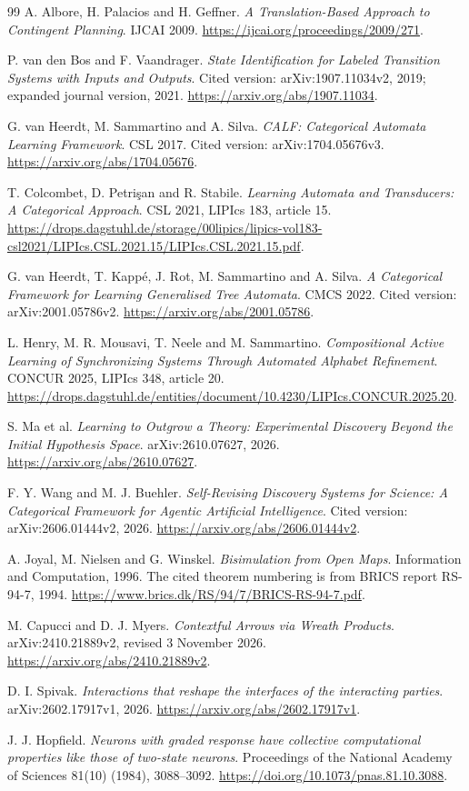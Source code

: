 \documentclass[11pt]{article}
\theoremstyle{definition}
\theoremstyle{remark}
\begin{document}
\begin{thebibliography}{99}
A. Albore, H. Palacios and H. Geffner.
\emph{A Translation-Based Approach to Contingent Planning}. IJCAI 2009.
\url{https://ijcai.org/proceedings/2009/271}.

P. van den Bos and F. Vaandrager.
\emph{State Identification for Labeled Transition Systems with Inputs
and Outputs}. Cited version: arXiv:1907.11034v2, 2019;
expanded journal version, 2021.
\url{https://arxiv.org/abs/1907.11034}.

G. van Heerdt, M. Sammartino and A. Silva.
\emph{CALF: Categorical Automata Learning Framework}. CSL 2017.
Cited version: arXiv:1704.05676v3.
\url{https://arxiv.org/abs/1704.05676}.

T. Colcombet, D. Petri\c{s}an and R. Stabile.
\emph{Learning Automata and Transducers: A Categorical Approach}.
CSL 2021, LIPIcs 183, article 15.
\url{https://drops.dagstuhl.de/storage/00lipics/lipics-vol183-csl2021/LIPIcs.CSL.2021.15/LIPIcs.CSL.2021.15.pdf}.

G. van Heerdt, T. Kapp\'e, J. Rot, M. Sammartino and A. Silva.
\emph{A Categorical Framework for Learning Generalised Tree Automata}.
CMCS 2022. Cited version: arXiv:2001.05786v2.
\url{https://arxiv.org/abs/2001.05786}.

L. Henry, M. R. Mousavi, T. Neele and M. Sammartino.
\emph{Compositional Active Learning of Synchronizing Systems Through
Automated Alphabet Refinement}. CONCUR 2025, LIPIcs 348, article 20.
\url{https://drops.dagstuhl.de/entities/document/10.4230/LIPIcs.CONCUR.2025.20}.

S. Ma et al.
\emph{Learning to Outgrow a Theory: Experimental Discovery Beyond the
Initial Hypothesis Space}. arXiv:2610.07627, 2026.
\url{https://arxiv.org/abs/2610.07627}.

F. Y. Wang and M. J. Buehler.
\emph{Self-Revising Discovery Systems for Science: A Categorical
Framework for Agentic Artificial Intelligence}.
Cited version: arXiv:2606.01444v2, 2026.
\url{https://arxiv.org/abs/2606.01444v2}.

A. Joyal, M. Nielsen and G. Winskel.
\emph{Bisimulation from Open Maps}. Information and Computation, 1996.
The cited theorem numbering is from BRICS report RS-94-7, 1994.
\url{https://www.brics.dk/RS/94/7/BRICS-RS-94-7.pdf}.

M. Capucci and D. J. Myers.
\emph{Contextful Arrows via Wreath Products}.
arXiv:2410.21889v2, revised 3 November 2026.
\url{https://arxiv.org/abs/2410.21889v2}.

D. I. Spivak.
\emph{Interactions that reshape the interfaces of the interacting parties}.
arXiv:2602.17917v1, 2026.
\url{https://arxiv.org/abs/2602.17917v1}.

J. J. Hopfield.
\emph{Neurons with graded response have collective computational
properties like those of two-state neurons}.
Proceedings of the National Academy of Sciences 81(10) (1984), 3088--3092.
\url{https://doi.org/10.1073/pnas.81.10.3088}.
\end{thebibliography}
\end{document}
